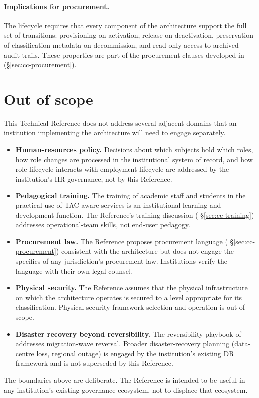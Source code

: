 \paragraph{Implications for procurement.} The lifecycle requires
that every component of the architecture support the full set
of transitions: provisioning on activation, release on
deactivation, preservation of classification metadata on
decommission, and read-only access to archived audit trails.
These properties are part of the procurement clauses developed in
 (\S\ref{sec:cc-procurement}).

\section{Out of scope}
\label{sec:cf-out-of-scope}

This Technical Reference does not address several adjacent
domains that an institution implementing the architecture will
need to engage separately.

\begin{itemize}[leftmargin=1.5em,nosep]
  \item \textbf{Human-resources policy.} Decisions about which
    subjects hold which roles, how role changes are processed in
    the institutional system of record, and how role lifecycle
    interacts with employment lifecycle are addressed by the
    institution's HR governance, not by this Reference.
  \item \textbf{Pedagogical training.} The training of academic
    staff and students in the practical use of TAC-aware
    services is an institutional learning-and-development
    function. The Reference's training discussion
    ( \S\ref{sec:cc-training}) addresses
    operational-team skills, not end-user pedagogy.
  \item \textbf{Procurement law.} The Reference proposes
    procurement language (
    \S\ref{sec:cc-procurement}) consistent with the architecture
    but does not engage the specifics of any jurisdiction's
    procurement law. Institutions verify the language with their
    own legal counsel.
  \item \textbf{Physical security.} The Reference assumes that
    the physical infrastructure on which the architecture
    operates is secured to a level appropriate for its
    classification. Physical-security framework selection and
    operation is out of scope.
  \item \textbf{Disaster recovery beyond reversibility.} The
    reversibility playbook of 
    addresses migration-wave reversal. Broader disaster-recovery
    planning (data-centre loss, regional outage) is engaged by
    the institution's existing DR framework and is not
    superseded by this Reference.
\end{itemize}

\noindent The boundaries above are deliberate. The Reference is
intended to be useful in any institution's existing governance
ecosystem, not to displace that ecosystem.
